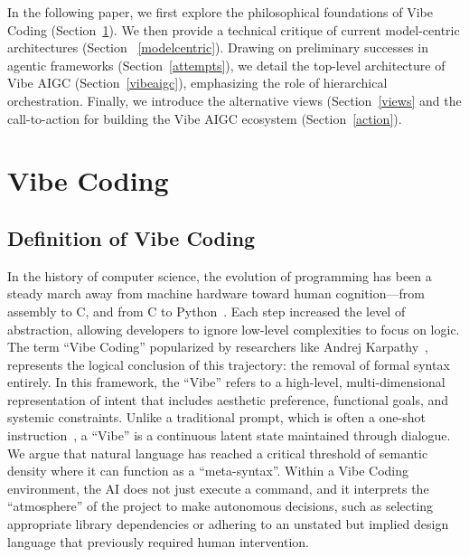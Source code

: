 \documentclass{article}
\begin{document}
In the following paper, we first explore the philosophical foundations of Vibe Coding (Section~\ref{vibecoding}). We then provide a technical critique of current model-centric architectures (Section ~\ref{modelcentric}). Drawing on preliminary successes in agentic frameworks (Section~\ref{attempts}), we detail the top-level architecture of Vibe AIGC (Section~\ref{vibeaigc}), emphasizing the role of hierarchical orchestration. Finally, we introduce the alternative views (Section~\ref{views} and the call-to-action for building the Vibe AIGC ecosystem (Section~\ref{action}).


\section{Vibe Coding}
\label{vibecoding}



\subsection{Definition of Vibe Coding}
In the history of computer science, the evolution of programming has been a steady march away from machine hardware toward human cognition—from assembly to C, and from C to Python~\citep{gemini-code-cli,zeng2025glm,anthropic2025claude45,achiam2023gpt, liu-etal-2025-m2rc}. Each step increased the level of abstraction, allowing developers to ignore low-level complexities to focus on logic.
The term ``Vibe Coding'' popularized by researchers like Andrej Karpathy~\citep{karpathy2025, horvat2025vibe}, represents the logical conclusion of this trajectory: the removal of formal syntax entirely.
In this framework, the ``Vibe'' refers to a high-level, multi-dimensional representation of intent that includes aesthetic preference, functional goals, and systemic constraints. Unlike a traditional prompt, which is often a one-shot instruction~\citep{mei2025survey, sapkota2025vibe}, a ``Vibe'' is a continuous latent state maintained through dialogue. We argue that natural language has reached a critical threshold of semantic density where it can function as a ``meta-syntax''. Within a Vibe Coding environment, the AI does not just execute a command,
and it interprets the ``atmosphere'' of the project to make autonomous decisions, such as selecting appropriate library dependencies or adhering to an unstated but implied design language that previously required human intervention.
\end{document}
